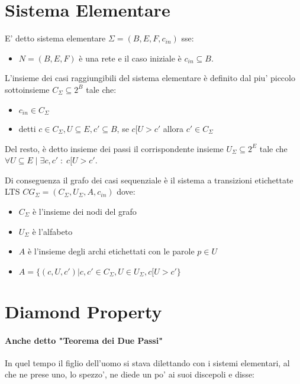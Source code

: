 \section{Sistema Elementare}

E' detto sistema elementare $\Sigma = (B, E, F, c_{in})$ sse:
\begin{itemize}
  \item $N = (B, E, F)$ \`e una rete e il caso iniziale \`e $c_{in} \subseteq B$.
\end{itemize}

L'insieme dei casi raggiungibili del sistema elementare \`e definito dal piu' piccolo sottoinsieme $C_\Sigma \subseteq 2^B$ tale che:
\begin{itemize}
  \item $c_{in} \in C_\Sigma$
  \item detti $c \in C_\Sigma, U \subseteq E, c' \subseteq B$, se $c[U>c'$ allora $c' \in C_\Sigma$
\end{itemize}

Del resto, \`e detto insieme dei passi il corrispondente insieme $U_\Sigma \subseteq 2^E$ tale che \\ $\forall U \subseteq E \; | \; \exists c,c' \; : \; c[U>c'$.

Di conseguenza il grafo dei casi sequenziale \`e il sistema a transizioni etichettate LTS $CG_\Sigma = (C_\Sigma, U_\Sigma, A, c_{in})$ dove:
\begin{itemize}
  \item $C_\Sigma$ \`e l'insieme dei nodi del grafo
  \item $U_\Sigma$ \`e l'alfabeto
  \item $A$ \`e l'insieme degli archi etichettati con le parole $p \in U$
  \item $A = \{ (c, U, c') | c,c' \in C_\Sigma, U \in U_\Sigma, c[U>c'\}$
\end{itemize}

\section{Diamond Property}

\paragraph{Anche detto "Teorema dei Due Passi"}

In quel tempo il figlio dell'uomo si stava dilettando con i sistemi elementari, al che ne prese uno, lo spezzo', ne diede un po' ai suoi discepoli e disse:

